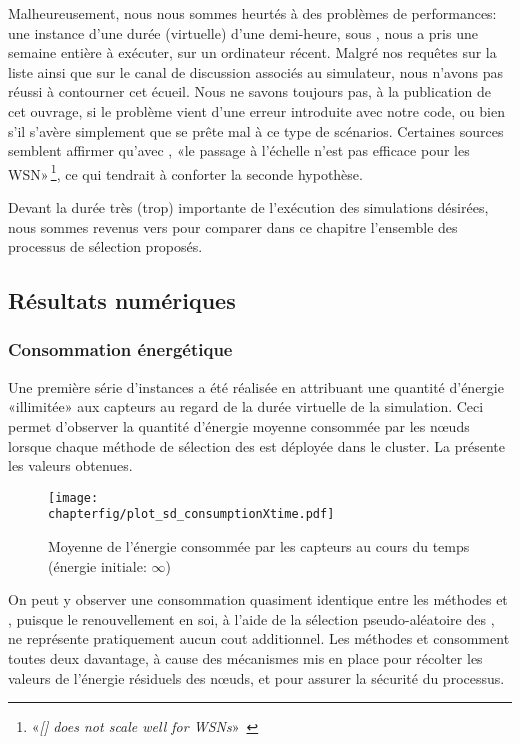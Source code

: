 Malheureusement, nous nous sommes heurtés à des problèmes de performances: une instance d'une durée (virtuelle) d'une demi-heure, sous \nsiii, nous a pris une semaine entière à exécuter, sur un ordinateur récent.
Malgré nos requêtes sur la liste ainsi que sur le canal de discussion associés au simulateur, nous n'avons pas réussi à contourner cet écueil.
Nous ne savons toujours pas, à la publication de cet ouvrage, si le problème vient d'une erreur introduite avec notre code, ou bien s'il s'avère simplement que \nsiii se prête mal à ce type de scénarios.
Certaines sources semblent affirmer qu'avec \nsiii, «le passage à l'échelle n'est pas efficace pour les WSN»\,\footnote{«\textit{[\nsiiinxs] does not scale well for WSNs}»~\cite{AAAHN12}}, ce qui tendrait à conforter la seconde hypothèse.

Devant la durée très (trop) importante de l'exécution des simulations désirées, nous sommes revenus vers \nsii pour comparer dans ce chapitre l'ensemble des processus de sélection proposés.

    \subsection{Résultats numériques}

        \subsubsection{Consommation énergétique}

Une première série d'instances a été réalisée en attribuant une quantité d'énergie «illimitée» aux capteurs au regard de la durée virtuelle de la simulation.
Ceci permet d'observer la quantité d'énergie moyenne consommée par les nœuds lorsque chaque méthode de sélection des \cns est déployée dans le cluster.
La  présente les valeurs obtenues.
\begin{figure}[!ht]
    \centering
    \texttt{[image: \\chapterfig/plot\_sd\_consumptionXtime.pdf]}
    \caption{Moyenne de l'énergie consommée par les capteurs au cours du temps (énergie initiale: $\infty$)}\label{sd:fig:cons-inf}
\end{figure}
On peut y observer une consommation quasiment identique entre les méthodes \idstat et \idrand, puisque le renouvellement en soi, à l'aide de la sélection pseudo-aléatoire des \cns, ne représente pratiquement aucun cout additionnel.
Les méthodes \ideres et \iddemx consomment toutes deux davantage, à cause des mécanismes mis en place pour récolter les valeurs de l'énergie résiduels des nœuds, et pour assurer la sécurité du processus.

